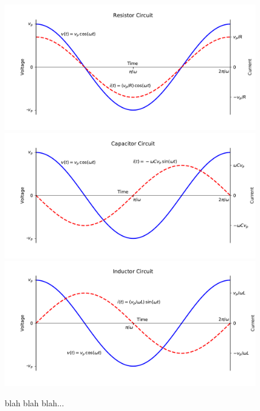 \documentclass[12pt,oneside]{book}
\begin{document}
\begin{figure}[htbp]
\begin{center}
\includegraphics[height=0.3\textheight]{figs/vit_res.pdf} \\
\includegraphics[height=0.3\textheight]{figs/vit_cap.pdf} \\
\includegraphics[height=0.3\textheight]{figs/vit_ind.pdf} \\


\caption{ blah blah blah...}
\label{fig:vit}
\end{center}
\end{figure}
\end{document}
